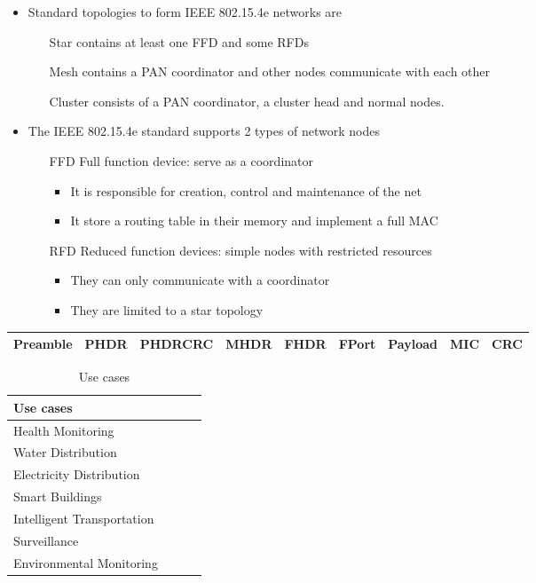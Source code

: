 \begin{itemize}
	\item Standard topologies to form IEEE 802.15.4e networks are 
		\begin{itemize}
			\item[Star] contains at least one FFD and some RFDs
			\item[Mesh] contains a PAN coordinator and other nodes communicate with each other
			\item[Cluster] consists of a PAN coordinator, a cluster head and normal nodes.
		\end{itemize}
			\item The IEEE 802.15.4e standard supports 2 types of network nodes
		\begin{itemize}
			\item[FFD] Full function device: serve as a coordinator
				\begin{itemize}
					\item It is responsible for creation, control and maintenance of the net
					\item It store a routing table in their memory and implement a full MAC
				\end{itemize}
			\item[RFD] Reduced function devices: simple nodes with restricted resources
				\begin{itemize}
					\item They can only communicate with a coordinator
					\item They are limited to a star topology
				\end{itemize}
			\end{itemize}
		\end{itemize}

\begin{tabulary}{\textwidth}{|C|C|C|C|C|C|C|C|C|}\hline
	Preamble & PHDR & PHDRCRC & MHDR & FHDR & FPort & Payload & MIC & CRC \\\hline
\end{tabulary}

\begin{table}[h!]
\begin{center}
	\begin{tabular}{l|l|l|l}
	\textbf{Use cases}         &  &  & \\\hline
	Health Monitoring          &  &  & \\\hline
	Water Distribution         &  &  & \\\hline
	Electricity Distribution   &  &  & \\\hline
	Smart Buildings            &  &  & \\\hline
	Intelligent Transportation &  &  & \\\hline
	Surveillance               &  &  & \\\hline
	Environmental Monitoring   &  &  & \\
	\end{tabular}
	\caption{\label{tab:IoTUseCase} Use cases \cite{hancke_role_2012}}
\end{center}
\end{table}


